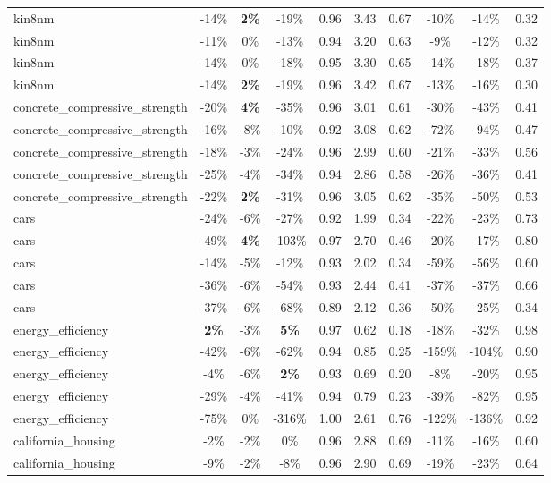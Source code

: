 \begin{table}[!htbp]
\begin{small}
\begin{sc}
{\begin{tabular}{lccccccccc}
kin8nm & -14\% & \textbf{2\%} & -19\% & 0.96 & 3.43 & 0.67 & -10\% & -14\% & 0.32 \\
kin8nm & -11\% & 0\% & -13\% & 0.94 & 3.20 & 0.63 & -9\% & -12\% & 0.32 \\
kin8nm & -14\% & 0\% & -18\% & 0.95 & 3.30 & 0.65 & -14\% & -18\% & 0.37 \\
kin8nm & -14\% & \textbf{2\%} & -19\% & 0.96 & 3.42 & 0.67 & -13\% & -16\% & 0.30 \\
concrete\_compressive\_strength & -20\% & \textbf{4\%} & -35\% & 0.96 & 3.01 & 0.61 & -30\% & -43\% & 0.41 \\
concrete\_compressive\_strength & -16\% & -8\% & -10\% & 0.92 & 3.08 & 0.62 & -72\% & -94\% & 0.47 \\
concrete\_compressive\_strength & -18\% & -3\% & -24\% & 0.96 & 2.99 & 0.60 & -21\% & -33\% & 0.56 \\
concrete\_compressive\_strength & -25\% & -4\% & -34\% & 0.94 & 2.86 & 0.58 & -26\% & -36\% & 0.41 \\
concrete\_compressive\_strength & -22\% & \textbf{2\%} & -31\% & 0.96 & 3.05 & 0.62 & -35\% & -50\% & 0.53 \\
cars & -24\% & -6\% & -27\% & 0.92 & 1.99 & 0.34 & -22\% & -23\% & 0.73 \\
cars & -49\% & \textbf{4\%} & -103\% & 0.97 & 2.70 & 0.46 & -20\% & -17\% & 0.80 \\
cars & -14\% & -5\% & -12\% & 0.93 & 2.02 & 0.34 & -59\% & -56\% & 0.60 \\
cars & -36\% & -6\% & -54\% & 0.93 & 2.44 & 0.41 & -37\% & -37\% & 0.66 \\
cars & -37\% & -6\% & -68\% & 0.89 & 2.12 & 0.36 & -50\% & -25\% & 0.34 \\
energy\_efficiency & \textbf{2\%} & -3\% & \textbf{5\%} & 0.97 & 0.62 & 0.18 & -18\% & -32\% & 0.98 \\
energy\_efficiency & -42\% & -6\% & -62\% & 0.94 & 0.85 & 0.25 & -159\% & -104\% & 0.90 \\
energy\_efficiency & -4\% & -6\% & \textbf{2\%} & 0.93 & 0.69 & 0.20 & -8\% & -20\% & 0.95 \\
energy\_efficiency & -29\% & -4\% & -41\% & 0.94 & 0.79 & 0.23 & -39\% & -82\% & 0.95 \\
energy\_efficiency & -75\% & 0\% & -316\% & 1.00 & 2.61 & 0.76 & -122\% & -136\% & 0.92 \\
california\_housing & -2\% & -2\% & 0\% & 0.96 & 2.88 & 0.69 & -11\% & -16\% & 0.60 \\
california\_housing & -9\% & -2\% & -8\% & 0.96 & 2.90 & 0.69 & -19\% & -23\% & 0.64 \\

\end{tabular}}
\end{sc}
\end{small}
\end{table}
